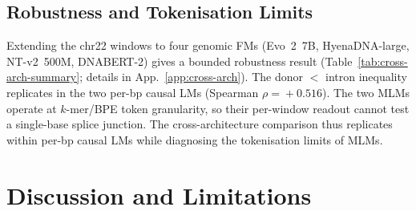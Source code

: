 \documentclass{article}
\theoremstyle{plain}
\theoremstyle{definition}
\theoremstyle{remark}
\begin{document}
\subsection{Robustness and Tokenisation Limits}
\label{sec:cross-arch}

Extending the chr22 windows to four genomic FMs (Evo~2~7B, HyenaDNA-large, NT-v2~500M, DNABERT-2) gives a bounded robustness result (Table~\ref{tab:cross-arch-summary}; details in App.~\ref{app:cross-arch}). The donor $<$ intron inequality replicates in the two per-bp causal LMs (Spearman $\rho\!=\!+0.516$). The two MLMs operate at $k$-mer/BPE token granularity, so their per-window readout cannot test a single-base splice junction. The cross-architecture comparison thus replicates within per-bp causal LMs while diagnosing the tokenisation limits of MLMs.

\begin{table}[t]
  \caption{Cross-model summary. Full per-window numbers and MLM tokenisation caveats are in App.~\ref{app:cross-arch}.}
  \label{tab:cross-arch-summary}
  \centering
  \footnotesize
  \setlength{\tabcolsep}{4pt}
\end{table}

\section{Discussion and Limitations}
\label{sec:discussion}
\end{document}
